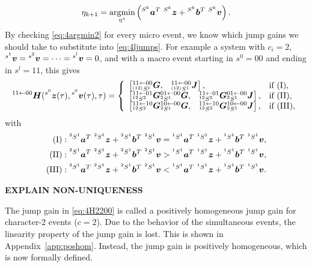 \documentclass[../DC2017114Bouma.tex]{subfiles}
\begin{document}
\begin{align}
\eta_{k+1} = \underset{\eta^*}{\argmin}\left(\ls^{S^k}\ab^T\ \ls^{S^k}\zb +\ls^{S^k}\bb^T\ \ls^{S^k}\vb\right).
\end{align}
By checking \eqref{eq:4argmin2} for every micro event, we know which jump gains we should take to substitute into \eqref{eq:4ljumps}.
For example a system with $c_i = 2$, $\hspace{0cm}^{s^1}{\boldsymbol{v}}=\hspace{0cm}^{s^2}{\boldsymbol{v}}=\dots=\hspace{0cm}^{s^l}{\boldsymbol{v}}=0$, and with a macro event starting in $s^0 = 00$ and ending in $s^l = 11$, this gives 
\begin{align}
\hspace{0cm}^{11\leftarrow 00}{\boldsymbol{H}}(\hspace{0cm}^{s^0}{\boldsymbol{z}}(\tau),\hspace{0cm}^{s^0}{\boldsymbol{v}}(\tau),\tau) = \left\lbrace\begin{array}{ll}
\begin{bmatrix}\hspace{0cm}^{11\leftarrow 00}_{\hspace{0cm}^{(12)}S^1}{\boldsymbol{G}}, & \hspace{0cm}^{11\leftarrow 00}_{\hspace{0cm}^{(12)}S^1}{\boldsymbol{J}}\end{bmatrix}, & \text{if }(\text{I}),\\
\begin{bmatrix}\hspace{0cm}^{11\leftarrow 01}_{\hspace{0cm}^{12}S^2}{\boldsymbol{G}} \hspace{0cm}^{01\leftarrow 00}_{\hspace{0cm}^{2}S^1}{\boldsymbol{G}}, & \hspace{0cm}^{11\leftarrow 01}_{\hspace{0cm}^{12}S^2}{\boldsymbol{G}} \hspace{0cm}^{01\leftarrow 00}_{\hspace{0cm}^{2}S^1}{\boldsymbol{J}}\end{bmatrix}, & \text{if }(\text{II}),\\
\begin{bmatrix}\hspace{0cm}^{11\leftarrow 10}_{\hspace{0cm}^{12}S^2}{\boldsymbol{G}} \hspace{0cm}^{10\leftarrow 00}_{\hspace{0cm}^{2}S^1}{\boldsymbol{G}}, & \hspace{0cm}^{11\leftarrow 10}_{\hspace{0cm}^{12}S^2}{\boldsymbol{G}} \hspace{0cm}^{10\leftarrow 00}_{\hspace{0cm}^{2}S^1}{\boldsymbol{J}}\end{bmatrix}, & \text{if }(\text{III}),
\end{array}\right.\label{eq:4H2200}
\end{align}
with
\begin{align}
(\text{I})&:\ls^{^2 S^1}\ab^T\ \ls^{^2 S^1}\zb +\ls^{^2 S^1}\bb^T\ \ls^{^2 S^1}\vb = \ls^{^1 S^1}\ab^T\ \ls^{^1 S^1}\zb +\ls^{^1 S^1}\bb^T\ \ls^{^1 S^1}\vb,\nonumber\\
(\text{II})&:\ls^{^2 S^1}\ab^T\ \ls^{^2 S^1}\zb +\ls^{^2 S^1}\bb^T\ \ls^{^2 S^1}\vb > \ls^{^1 S^1}\ab^T\ \ls^{^1 S^1}\zb +\ls^{^1 S^1}\bb^T\ \ls^{^1 S^1}\vb,\label{eq:4conds}\\
(\text{III})&:\ls^{^2 S^1}\ab^T\ \ls^{^2 S^1}\zb +\ls^{^2 S^1}\bb^T\ \ls^{^2 S^1}\vb < \ls^{^1 S^1}\ab^T\ \ls^{^1 S^1}\zb +\ls^{^1 S^1}\bb^T\ \ls^{^1 S^1}\vb.\nonumber
\end{align}

\textbf{EXPLAIN NON-UNIQUENESS}

The jump gain in \eqref{eq:4H2200} is called a positively homogeneous jump gain for character-2 events ($c=2$). Due to the behavior of the simultaneous events, the linearity property of the jump gain is lost. This is shown in Appendix~\ref{app:poshom}. Instead, the jump gain is positively homogeneous, which is now formally defined.
 
\end{document}
